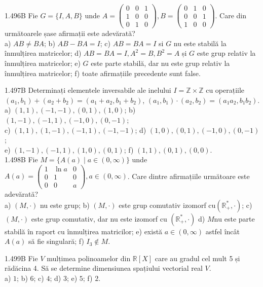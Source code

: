 \documentclass[11pt]{article}
\begin{document}
1.496B Fie $G=\{I, A, B\}$ unde $A=\left(\begin{array}{lll}0 & 0 & 1 \\ 1 & 0 & 0 \\ 0 & 1 & 0\end{array}\right), B=\left(\begin{array}{lll}0 & 1 & 0 \\ 0 & 0 & 1 \\ 1 & 0 & 0\end{array}\right)$. Care din următoarele șase afirmații este adevărată?\\ a) $A B \neq B A$; b) $A B-B A=I$; c) $A B=B A=I$ si $G$ nu este stabilă la înmulțirea matricelor; d) $A B=B A=I, A^{2}=B, B^{2}=A$ și $G$ este grup relativ la înmulțirea matricelor; e) $G$ este parte stabilă, dar nu este grup relativ la înmulțirea matricelor; f) toate afirmațiile precedente sunt false.

1.497B Determinați elementele inversabile ale inelului $I=\mathbb{Z} \times \mathbb{Z}$ cu operațiile $\left(a_{1}, b_{1}\right)+\left(a_{2}+b_{2}\right)=\left(a_{1}+a_{2}, b_{1}+b_{2}\right)$, $\left(a_{1}, b_{1}\right) \cdot\left(a_{2}, b_{2}\right)=\left(a_{1} a_{2}, b_{1} b_{2}\right)$.\\ a) $(1,1),(-1,-1),(0,1),(1,0)$; b) $(1,-1),(-1,1),(-1,0),(0,-1)$;\\ c) $(1,1),(1,-1),(-1,1),(-1,-1)$; d) $(1,0),(0,1),(-1,0),(0,-1)$;\\ e) $(1,-1),(-1,1),(1,0),(0,1)$; f) $(1,1),(0,1),(0,0)$.\\

1.498B Fie $M=\{A(a) \mid a \in(0, \infty)\}$ unde $A(a)=\left(\begin{array}{ccc}1 & \ln a & 0 \\ 0 & 1 & 0 \\ 0 & 0 & a\end{array}\right), a \in(0, \infty)$. Care dintre afirmațiile următoare este adevărată?\\ a) $(M, \cdot)$ nu este grup; b) $(M, \cdot)$ este grup comutativ izomorf $\mathrm{cu}\left(\mathbb{R}_{+}^{*}, \cdot\right)$; c) $(M, \cdot)$ este grup comutativ, dar nu este izomorf cu $\left(\mathbb{R}_{+}^{*}, \cdot\right)$ d) $M \mathrm{nu}$ este parte stabilă în raport cu înmulțirea matricilor; e) există $a \in(0, \infty)$ astfel încât $A(a)$ să fie singulară; f) $I_{3} \notin M$.

1.499B Fie $V$ mulțimea polinoamelor din $\mathbb{R}[X]$ care au gradul cel mult 5 și rădăcina 4. Să se determine dimensiunea spațiului vectorial real $V$.\\ a) $1$; b) $6$; c) $4$; d) $3$; e) $5$; f) $2$.
\end{document}
